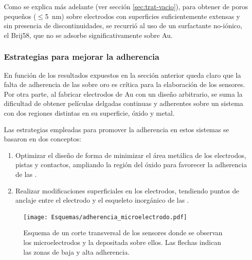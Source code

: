 			Como se explica más adelante (ver sección \ref{sec:trat-vacio}), para obtener \pdm\space de poros pequeños ($\leq$\SI{5}{\nm}) sobre electrodos con superficies suficientemente extensas y sin presencia de discontinuidades, se recurrió al uso de un surfactante no-iónico, el Brij58, que no se adsorbe significativamente sobre Au.
							
		\subsubsection{Estrategias para mejorar la adherencia}\label{sec:adherencia}

			 En función de los resultados expuestos en la sección anterior queda claro que la falta de adherencia de las \pdm\space sobre oro es crítica para la elaboración de los sensores. Por otra parte, al fabricar electrodos de Au con un diseño arbitrario, se suma la dificultad de obtener películas delgadas continuas y adherentes sobre un sistema con dos regiones distintas en su superficie, óxido y metal.
 			
             Las estrategias empleadas para promover la adherencia en estos sistemas se basaron en dos conceptos:
				\begin{enumerate}

					\item Optimizar el diseño de forma de minimizar el área metálica de los electrodos, pistas y contactos, ampliando la región del óxido para favorecer la adherencia de las \pdm.

					\item Realizar modificaciones superficiales en los electrodos, tendiendo puntos de anclaje entre el electrodo y el esqueleto inorgánico de las \pdm.

					\end{enumerate}
					
					\begin{figure}[!b]
					\begin{center}
					\texttt{[image: Esquemas/adherencia\_microelectrodo.pdf]}
					\caption[Adherencia a los microelectrodos.]{Esquema de un corte transversal de los sensores donde se observan los microelectrodos y la \pdm\space depositada sobre ellos. Las flechas indican las zonas de baja y alta adherencia.}
					\label{fig:adherencia_microelectrodo}
					\end{center}
					\end{figure}

